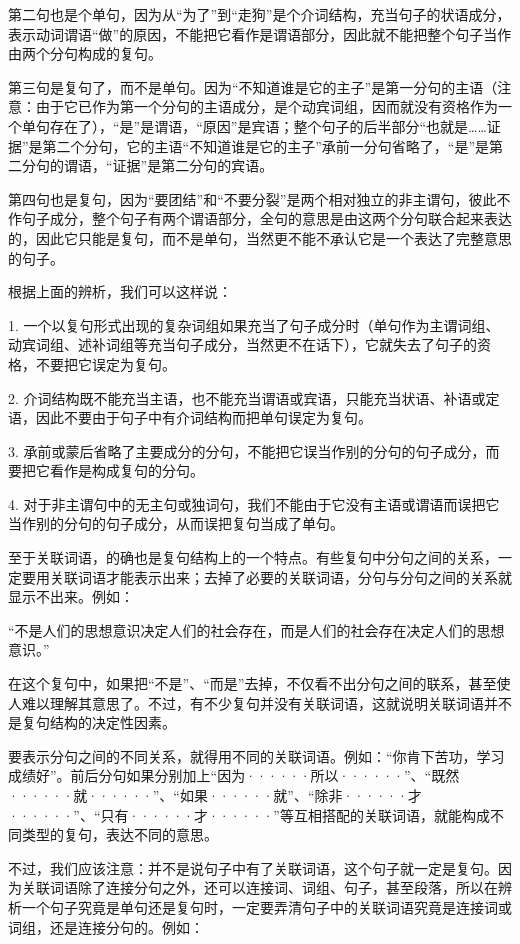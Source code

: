 第二句也是个单句，因为从“为了”到“走狗”是个介词结构，充当句子的状语成分，表示动词谓语“做”的原因，不能把它看作是谓语部分，因此就不能把整个句子当作由两个分句构成的复句。

第三句是复句了，而不是单句。因为“不知道谁是它的主子”是第一分句的主语（注意：由于它已作为第一个分句的主语成分，是个动宾词组，因而就没有资格作为一个单句存在了），“是”是谓语，“原因”是宾语；整个句子的后半部分“也就是……证据”是第二个分句，它的主语“不知道谁是它的主子”承前一分句省略了，“是”是第二分句的谓语，“证据”是第二分句的宾语。

第四句也是复句，因为“要团结”和“不要分裂”是两个相对独立的非主谓句，彼此不作句子成分，整个句子有两个谓语部分，全句的意思是由这两个分句联合起来表达的，因此它只能是复句，而不是单句，当然更不能不承认它是一个表达了完整意思的句子。

根据上面的辨析，我们可以这样说：

1. 一个以复句形式出现的复杂词组如果充当了句子成分时（单句作为主谓词组、动宾词组、述补词组等充当句子成分，当然更不在话下），它就失去了句子的资格，不要把它误定为复句。

2. 介词结构既不能充当主语，也不能充当谓语或宾语，只能充当状语、补语或定语，因此不要由于句子中有介词结构而把单句误定为复句。

3. 承前或蒙后省略了主要成分的分句，不能把它误当作别的分句的句子成分，而要把它看作是构成复句的分句。

4. 对于非主谓句中的无主句或独词句，我们不能由于它没有主语或谓语而误把它当作别的分句的句子成分，从而误把复句当成了单句。

至于关联词语，的确也是复句结构上的一个特点。有些复句中分句之间的关系，一定要用关联词语才能表示出来；去掉了必要的关联词语，分句与分句之间的关系就显示不出来。例如：

“不是人们的思想意识决定人们的社会存在，而是人们的社会存在决定人们的思想意识。”

在这个复句中，如果把“不是”、“而是”去掉，不仅看不出分句之间的联系，甚至使人难以理解其意思了。不过，有不少复句并没有关联词语，这就说明关联词语并不是复句结构的决定性因素。

要表示分句之间的不同关系，就得用不同的关联词语。例如：“你肯下苦功，学习成绩好”。前后分句如果分别加上“因为······所以······”、“既然······就······”、“如果······就”、“除非······才······”、“只有······才······”等互相搭配的关联词语，就能构成不同类型的复句，表达不同的意思。

不过，我们应该注意：并不是说句子中有了关联词语，这个句子就一定是复句。因为关联词语除了连接分句之外，还可以连接词、词组、句子，甚至段落，所以在辨析一个句子究竟是单句还是复句时，一定要弄清句子中的关联词语究竟是连接词或词组，还是连接分句的。例如：

